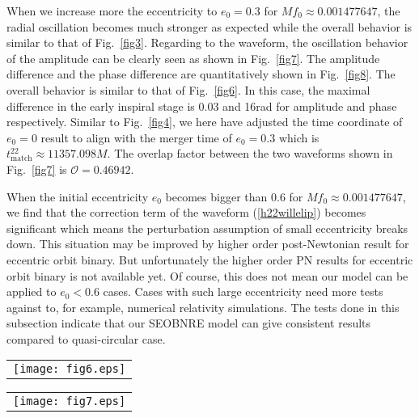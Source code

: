 \documentclass[prd,aps,a4paper,superscriptaddress,twocolumn,footinbib,showpacs]{revtex4}
\begin{document}
When we increase more the eccentricity to $e_0=0.3$ for $Mf_0\approx0.001477647$, the radial oscillation becomes much stronger as expected while the overall behavior is similar to that of Fig.~\ref{fig3}. Regarding to the waveform, the oscillation behavior of the amplitude can be clearly seen as shown in Fig.~\ref{fig7}. The amplitude difference and the phase difference are quantitatively shown in Fig.~\ref{fig8}. The overall behavior is similar to that of Fig.~\ref{fig6}. In this case, the maximal difference in the early inspiral stage is 0.03 and 16rad for amplitude and phase respectively. Similar to Fig.~\ref{fig4}, we here have adjusted the time coordinate of $e_0=0$ result to align with the merger time of $e_0=0.3$ which is $t^{22}_{\text{match}}\approx11357.098M$. The overlap factor between the two waveforms shown in Fig.~\ref{fig7} is $\mathcal{O}=0.46942$.

When the initial eccentricity $e_0$ becomes bigger than $0.6$ for $Mf_0\approx0.001477647$, we find that the correction term of the waveform (\ref{h22willelip}) becomes significant which means the perturbation assumption of small eccentricity breaks down. This situation may be improved by higher order post-Newtonian result for eccentric orbit binary. But unfortunately the higher order PN results for eccentric orbit binary is not available yet. Of course, this does not mean our model can be applied to $e_0<0.6$ cases. Cases with such large eccentricity need more tests against to, for example, numerical relativity simulations. The tests done in this subsection indicate that our SEOBNRE model can give consistent results compared to quasi-circular case.
\begin{figure*}
\begin{tabular}{c}
\texttt{[image: fig6.eps]}
\end{tabular}
\caption{Amplitude and phase comparison for $h_{22}$ corresponding to the case $e_0=0.03$ shown in Fig.~\ref{fig5}. The result of $e_0=0$ is got through SEOBNRv1 code, and the $e_0=0.03$ result is got by SEOBNRE model.}\label{fig6}
\end{figure*}

\begin{figure*}
\begin{tabular}{c}
\texttt{[image: fig7.eps]}
\end{tabular}
\caption{Similar to Fig.~\ref{fig1} but for two identical spinless black holes with eccentricity $e_0=0.3$ at $Mf_0\approx0.0015$. The result of $e_0=0$ is got through SEOBNRv1 code, and the $e_0=0.3$ result is got by SEOBNRE model.}\label{fig7}
\end{figure*}
\end{document}
